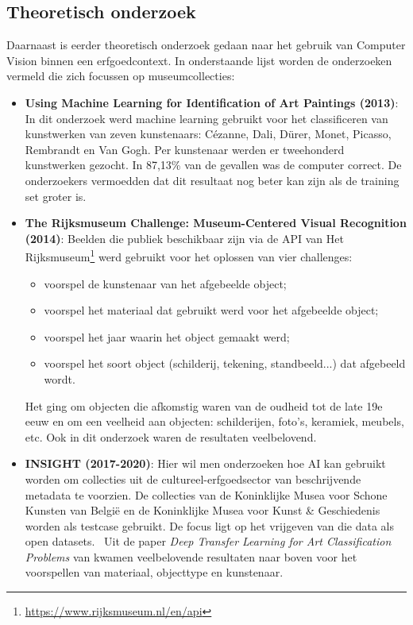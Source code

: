 \subsection{Theoretisch onderzoek}
Daarnaast is eerder theoretisch onderzoek gedaan naar het gebruik van Computer Vision binnen een erfgoedcontext. In onderstaande lijst worden de onderzoeken vermeld die zich focussen op museumcollecties:
\begin{itemize}
	\item \textbf{Using Machine Learning for Identification of Art Paintings (2013)}: In dit onderzoek werd machine learning gebruikt voor het classificeren van kunstwerken van zeven kunstenaars: C\'{e}zanne, Dali, D\"{u}rer, Monet, Picasso, Rembrandt en Van Gogh. Per kunstenaar werden er tweehonderd kunstwerken gezocht. In 87,13\% van de gevallen was de computer correct. De onderzoekers vermoedden dat dit resultaat nog beter kan zijn als de training set groter is.~\autocite{Blessings2013}

	\item \textbf{The Rijksmuseum Challenge: Museum-Centered Visual Recognition (2014)}: Beelden die publiek beschikbaar zijn via de API van Het Rijksmuseum\footnote{\url{https://www.rijksmuseum.nl/en/api}} werd gebruikt voor het oplossen van vier challenges:
	\begin{itemize}
		\item voorspel de kunstenaar van het afgebeelde object;
		\item voorspel het materiaal dat gebruikt werd voor het afgebeelde object;
		\item voorspel het jaar waarin het object gemaakt werd;
		\item voorspel het soort object (schilderij, tekening, standbeeld...) dat afgebeeld wordt.
	\end{itemize}
	Het ging om objecten die afkomstig waren van de oudheid tot de late 19e eeuw en om een veelheid aan objecten: schilderijen, foto's, keramiek, meubels, etc. Ook in dit onderzoek waren de resultaten veelbelovend.~\autocite{Mensink2014}

	\item \textbf{INSIGHT (2017-2020)}: Hier wil men onderzoeken hoe AI kan gebruikt worden om collecties uit de cultureel-erfgoedsector van beschrijvende metadata te voorzien. De collecties van de Koninklijke Musea voor Schone Kunsten van Belgi\"{e} en de Koninklijke Musea voor Kunst \& Geschiedenis worden als testcase gebruikt. De focus ligt op het vrijgeven van die data als open datasets.~\autocite{UniAntwerpen2017?} Uit de paper \emph{Deep Transfer Learning for Art Classification Problems} van \textcite{Sabatteli2018} kwamen veelbelovende resultaten naar boven voor het voorspellen van materiaal, objecttype en kunstenaar.


\end{itemize}
